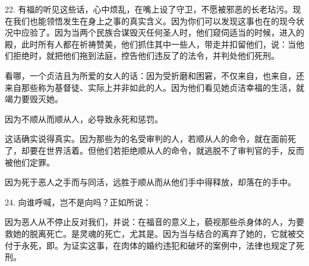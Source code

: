 22. 有福的听见这些话，心中烦乱，在嘴上设了守卫，不愿被邪恶的长老玷污。现在我们也能领悟发生在身上之事的真实含义。因为你们可以发现这事也在的现今状况中应验了。因为当两个民族合谋毁灭任何圣人时，他们窥伺适当的时候，进入的殿，此时所有人都在祈祷赞美，他们抓住其中一些人，带走并扣留他们，说：当他们拒绝时，就把他们拖到法庭，控告他们违反了的法令，并判处他们死刑。\par

看哪，一个贞洁且为所爱的女人的话：因为受折磨和困窘，不仅来自，也来自，还来自那些称为基督徒、实际上并非如此的人。因为他们看见她贞洁幸福的生活，就竭力要毁灭她。\par

因为不顺从而顺从人，必导致永死和惩罚。\par

这话确实说得真实。因为那些为的名受审判的人，若顺从人的命令，就在面前死了，却要在世界活着。但他们若拒绝顺从人的命令，就逃脱不了审判官的手，反而被他们定罪。\par

因为死于恶人之手而与同活，远胜于顺从而从他们手中得释放，却落在的手中。\par

24. 向谁呼喊，岂不是向吗？正如所说：\par

因为恶人从不停止反对我们，并说：在福音的意义上，藐视那些杀身体的人，为要救她的脱离死亡。是灵魂的死亡，尤其是。因为当与结合的离弃了她的，它就被交付于永死，即。为证实这事，在肉体的婚约违犯和破坏的案例中，法律也规定了死刑。\par

